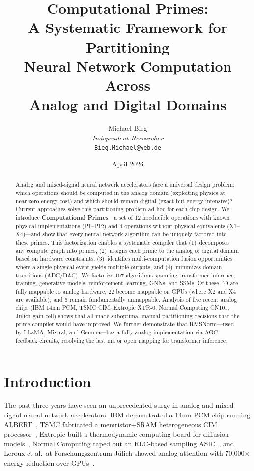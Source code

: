 \documentclass[11pt]{article}
\title{Computational Primes:\\A Systematic Framework for Partitioning\\Neural Network Computation Across\\Analog and Digital Domains}
\author{Michael Bieg\\
\textit{Independent Researcher}\\
\texttt{Bieg.Michael@web.de}}
\date{April 2026}
\begin{document}
\maketitle

\begin{abstract}
Analog and mixed-signal neural network accelerators face a universal design problem: which operations should be computed in the analog domain (exploiting physics at near-zero energy cost) and which should remain digital (exact but energy-intensive)? Current approaches solve this partitioning problem ad hoc for each chip design. We introduce \textbf{Computational Primes}---a set of 12 irreducible operations with known physical implementations (P1--P12) and 4 operations without physical equivalents (X1--X4)---and show that every neural network algorithm can be uniquely factored into these primes. This factorization enables a systematic compiler that (1)~decomposes any compute graph into primes, (2)~assigns each prime to the analog or digital domain based on hardware constraints, (3)~identifies multi-computation fusion opportunities where a single physical event yields multiple outputs, and (4)~minimizes domain transitions (ADC/DAC). We factorize 107 algorithms spanning transformer inference, training, generative models, reinforcement learning, GNNs, and SSMs. Of these, 79 are fully mappable to analog hardware, 22 become mappable on GPUs (where X2 and X4 are available), and 6 remain fundamentally unmappable. Analysis of five recent analog chips (IBM 14nm PCM, TSMC CIM, Extropic XTR-0, Normal Computing CN101, J\"ulich gain-cell) shows that all made suboptimal manual partitioning decisions that the prime compiler would have improved. We further demonstrate that RMSNorm---used by LLaMA, Mistral, and Gemma---has a fully analog implementation via AGC feedback circuits, resolving the last major open mapping for transformer inference.
\end{abstract}

\section{Introduction}

The past three years have seen an unprecedented surge in analog and mixed-signal neural network accelerators. IBM demonstrated a 14nm PCM chip running ALBERT~\cite{ibm2025}, TSMC fabricated a memristor+SRAM heterogeneous CIM processor~\cite{tsmc2025}, Extropic built a thermodynamic computing board for diffusion models~\cite{extropic2025}, Normal Computing taped out an RLC-based sampling ASIC~\cite{normal2025}, and Leroux et al.\ at Forschungszentrum J\"ulich showed analog attention with 70,000$\times$ energy reduction over GPUs~\cite{leroux2025a}.
\end{document}
